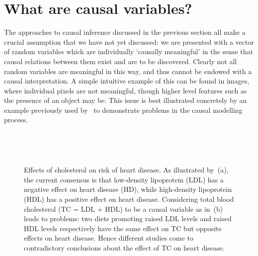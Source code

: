 \section{What are causal variables?}

The approaches to causal inference discussed in the previous section all make a crucial assumption that we have not yet discussed: we are presented with a vector of random variables which are individually `causally meaningful' in the sense that causal relations between them exist and are to be discovered. 
Clearly not all random variables are meaningful in this way, and thus cannot be endowed with a causal interpretation.
A simple intuitive example of this can be found in images, where individual pixels are not meaningful, though higher level features such as the presence of an object may be.
This issue is best illustrated concretely by an example previously used by~\cite{spirtes2004causal} to demonstrate problems in the causal modelling process.


\begin{figure}
	\begin{subfigure}{.45\linewidth}
		\center\
		\caption{}\label{fig:cholesterol:a}
	\end{subfigure}
	\hfill
	\begin{subfigure}{.45\linewidth}
		\center\
		\caption{}\label{fig:cholesterol:b}
	\end{subfigure}
	\caption{Effects of cholesterol on risk of heart disease. As illustrated by~(a), the current consensus is that low-density lipoprotein (LDL) has a negative effect on heart disease (HD), while high-density lipoprotein (HDL) has a positive effect on heart disease. Considering total blood cholesterol (TC = LDL + HDL) to be a causal variable as in~(b) leads to problems: two diets promoting raised LDL levels and raised HDL levels respectively have the same effect on TC but opposite effects on heart disease. Hence different studies come to contradictory conclusions about the effect of TC on heart disease.}
	\label{fig:cholesterol}
\end{figure}


